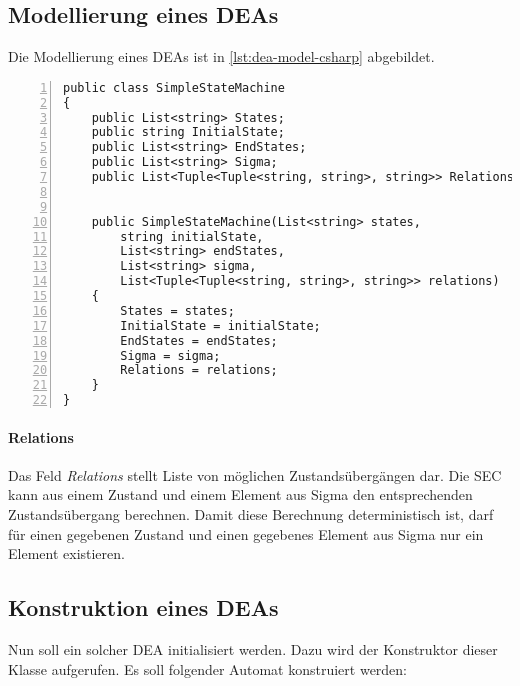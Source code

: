 \subsection{Modellierung eines DEAs}
Die Modellierung eines DEAs ist in \cref{lst:dea-model-csharp} abgebildet. 

\begin{lstlisting}[breaklines=true, tabsize=2, showstringspaces=false, frame=single, numbers=left, basicstyle=\small, label = {lst:dea-model-csharp}, caption={Modellierung eines DEA in C\#}, captionpos=b] 
public class SimpleStateMachine
{
	public List<string> States;
	public string InitialState;
	public List<string> EndStates;
	public List<string> Sigma;
	public List<Tuple<Tuple<string, string>, string>> Relations;
	
	
	public SimpleStateMachine(List<string> states,
		string initialState,
		List<string> endStates,
		List<string> sigma,
		List<Tuple<Tuple<string, string>, string>> relations)
	{
		States = states;
		InitialState = initialState;
		EndStates = endStates;
		Sigma = sigma;
		Relations = relations;
	}
}
\end{lstlisting}

\paragraph*{Relations}
Das Feld \textit{Relations} stellt Liste von möglichen Zustandsübergängen dar. Die SEC kann aus einem Zustand und einem Element aus Sigma den entsprechenden Zustandsübergang berechnen. Damit diese Berechnung deterministisch ist, darf für einen gegebenen Zustand und einen gegebenes Element aus Sigma nur ein Element existieren. 

\subsection{Konstruktion eines DEAs}
Nun soll ein solcher DEA initialisiert werden. Dazu wird der Konstruktor dieser Klasse aufgerufen. Es soll folgender Automat konstruiert werden:

